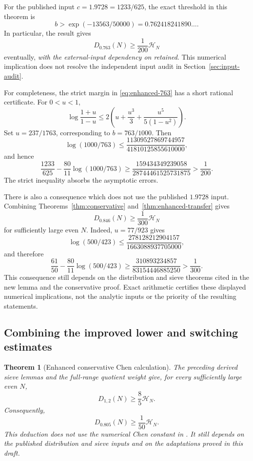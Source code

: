 \documentclass[11pt]{article}
\newtheorem{theorem}{Theorem}
\newcommand{\HN}{\mathcal H_N}
\begin{document}
For the published input $c=1.9728=1233/625$, the exact threshold in
this theorem is
\[
 b>\exp(-13563/50000)=0.762418241890\ldots.
\]
In particular, the result gives
\begin{equation}\label{eq:enhanced-763}
 D_{0.763}(N)\ge\frac{1}{200}\HN
\end{equation}
eventually, \emph{with the external-input dependency on
\cite[Theorem 1.1]{Li2026} retained}. This numerical implication
does not resolve the independent input audit in
Section~\ref{sec:input-audit}.

For completeness, the strict margin in \eqref{eq:enhanced-763}
has a short rational certificate. For $0<u<1$,
\[
 \log\frac{1+u}{1-u}
 \le 2\left(u+\frac{u^3}{3}+
                 \frac{u^5}{5(1-u^2)}\right).
\]
Set $u=237/1763$, corresponding to $b=763/1000$. Then
\[
 \log(1000/763)
 \le\frac{11309527869744957}{41810125855610000},
\]
and hence
\[
 \frac{1233}{625}-\frac{80}{11}\log(1000/763)
 \ge\frac{159434349239058}{28744461525731875}
 >\frac1{200}.
\]
The strict inequality absorbs the asymptotic errors.

There is also a consequence which does not use the published
$1.9728$ input. Combining Theorems~\ref{thm:conservative}
and~\ref{thm:enhanced-transfer} gives
\begin{equation}\label{eq:enhanced-846}
 D_{0.846}(N)\ge\frac1{300}\HN
\end{equation}
for sufficiently large even $N$. Indeed, $u=77/923$ gives
\[
 \log(500/423)\le
 \frac{278128212904157}{1663088937705000},
\]
and therefore
\[
 \frac{61}{50}-\frac{80}{11}\log(500/423)
 \ge\frac{310893234857}{83154446885250}>
 \frac1{300}.
\]
This consequence still depends on the distribution and sieve theorems
cited in the new lemma and the conservative proof. Exact arithmetic
certifies these displayed numerical implications, not the analytic
inputs or the priority of the resulting statements.

\subsection{Combining the improved lower and switching estimates}
\label{sec:enhanced-chen}

\begin{theorem}[Enhanced conservative Chen calculation]
\label{thm:enhanced-chen}
The preceding derived sieve lemmas and the full-range quotient weight give,
for every sufficiently large even $N$,
\begin{equation}\label{eq:enhanced-chen-constant}
 D_{1,2}(N)\ge\frac85\HN.
\end{equation}
Consequently,
\begin{equation}\label{eq:enhanced-805}
 D_{0.805}(N)\ge\frac1{50}\HN.
\end{equation}
This deduction does not use the numerical Chen constant in
\cite{Li2026}. It still depends on the published distribution and sieve
inputs and on the adaptations proved in this draft.
\end{theorem}
\end{document}
